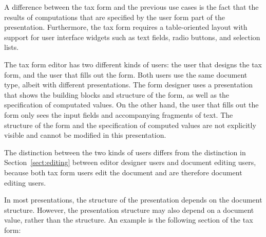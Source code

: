 A difference between the tax form and the previous use cases is the fact that the results of computations that are specified by the user form part of the presentation. Furthermore, the tax form requires a table-oriented layout with support for user interface widgets such as text fields, radio buttons, and selection lists.

The tax form editor has two different kinds of users: the user that designs the tax form, and the user that fills out the form. Both users use the same document type, albeit with different presentations. The form designer uses a presentation that shows the building blocks and structure of the form, as well as the specification of computated values. On the other hand, the user that fills out the form only sees the input fields and accompanying fragments of text. The structure of the form and the specification of computed values are not explicitly visible and cannot be modified in this presentation.

The distinction between the two kinds of users differs from the distinction in Section~\ref{sect:editing} between editor designer users and  document editing users, because both tax form users edit the document and are therefore document editing users.



In most presentations, the structure of the presentation depends on the document structure. However, the presentation structure may also depend on a document value, rather than the structure. An example is the following section of the tax form:

